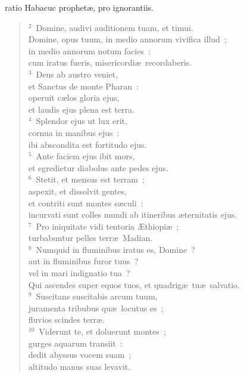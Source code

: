 \bchapter
{}ratio Habacuc prophet\ae , pro ignorantiis.


\begin{verse}\vspace{6pt}${}^{2}$~Domine, audivi auditionem tuam, et timui.\\ Domine, opus tuum, in medio annorum vivifica illud~;\\ in medio annorum notum facies~:\\ cum iratus fueris, misericordi\ae\ recordaberis.\\
${}^{3}$~Deus ab austro veniet,\\ et Sanctus de monte Pharan~:\\ operuit c\ae los gloria ejus,\\ et laudis ejus plena est terra.\\
${}^{4}$~Splendor ejus ut lux erit,\\ cornua in manibus ejus~:\\ ibi abscondita est fortitudo ejus.\\
${}^{5}$~Ante faciem ejus ibit mors,\\ et egredietur diabolus ante pedes ejus.\\
${}^{6}$~Stetit, et mensus est terram~;\\ aspexit, et dissolvit gentes,\\ et contriti sunt montes s\ae culi~:\\ incurvati sunt colles mundi ab itineribus \ae ternitatis ejus.\\
${}^{7}$~Pro iniquitate vidi tentoria \AE thiopi\ae~;\\ turbabuntur pelles terr\ae\ Madian.\\
${}^{8}$~Numquid in fluminibus iratus es, Domine~?\\ aut in fluminibus furor tuus~?\\ vel in mari indignatio tua~?\\ Qui ascendes super equos tuos, et quadrig\ae\ tu\ae\ salvatio.\\
${}^{9}$~Suscitans suscitabis arcum tuum,\\ juramenta tribubus qu\ae\ locutus es~;\\ fluvios scindes terr\ae .\\
${}^{10}$~Viderunt te, et doluerunt montes~;\\ gurges aquarum transiit~:\\ dedit abyssus vocem suam~;\\ altitudo manus suas levavit.\\

\end{verse}
